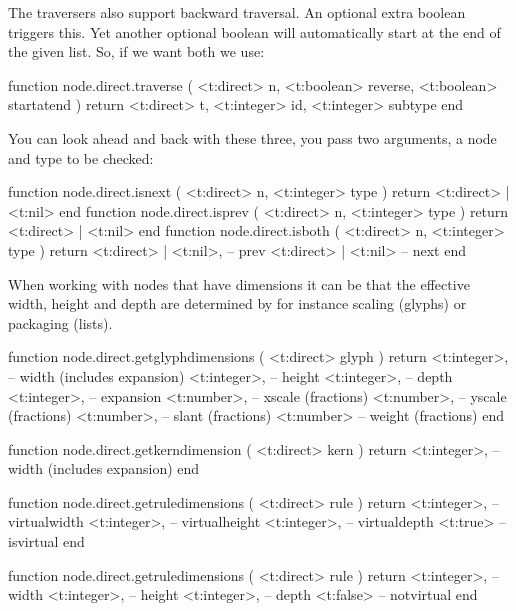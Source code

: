 The traversers also support backward traversal. An optional extra boolean triggers
this. Yet another optional boolean will automatically start at the end of the
given list. So, if we want both we use:

\starttyping[option=LUA]
function node.direct.traverse (
    <t:direct>  n,
    <t:boolean> reverse,
    <t:boolean> startatend
)
    return
        <t:direct>  t,
        <t:integer> id,
        <t:integer> subtype
end
\stoptyping

You can look ahead and back with these three, you pass two arguments, a node and
type to be checked:

\starttyping[option=LUA]
function node.direct.isnext ( <t:direct> n, <t:integer> type )
    return <t:direct> | <t:nil>
end
function node.direct.isprev ( <t:direct> n, <t:integer> type )
    return <t:direct> | <t:nil>
end
function node.direct.isboth ( <t:direct> n, <t:integer> type )
    return
        <t:direct> | <t:nil>, -- prev
        <t:direct> | <t:nil>  -- next
end
\stoptyping

\stopsubsection

\startsubsection[title=Dimensions]

When working with nodes that have dimensions it can be that the effective
width, height and depth are determined by for instance scaling (glyphs) or
packaging (lists).

\starttyping[option=LUA]
function node.direct.getglyphdimensions ( <t:direct> glyph )
    return
        <t:integer>, -- width  (includes expansion)
        <t:integer>, -- height
        <t:integer>, -- depth
        <t:integer>, -- expansion
        <t:number>,  -- xscale (fractions)
        <t:number>,  -- yscale (fractions)
        <t:number>,  -- slant  (fractions)
        <t:number>   -- weight (fractions)
end
\stoptyping

\starttyping[option=LUA]
function node.direct.getkerndimension ( <t:direct> kern )
    return <t:integer>, -- width (includes expansion)
end
\stoptyping

\starttyping[option=LUA]
function node.direct.getruledimensions ( <t:direct> rule )
    return
        <t:integer>, -- virtualwidth
        <t:integer>, -- virtualheight
        <t:integer>, -- virtualdepth
        <t:true>     -- isvirtual
end

function node.direct.getruledimensions ( <t:direct> rule )
    return
    <t:integer>, -- width
    <t:integer>, -- height
    <t:integer>, -- depth
    <t:false>    -- notvirtual
end
\stoptyping

